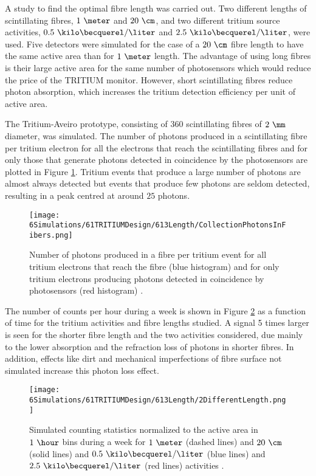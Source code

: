 A study to find the optimal fibre length was carried out. Two different lengths of scintillating fibres, $1~\meter$ and $20~\cm$, and two different tritium source activities, $0.5~\kilo\becquerel/\liter$ and $2.5~\kilo\becquerel/\liter$, were used. Five detectors were simulated for the case of a $20~\cm$ fibre length to have the same active area than for $1~\meter$ length. The advantage of using long fibres is their large active area for the same number of photosensors which would reduce the price of the TRITIUM monitor. However, short scintillating fibres reduce photon absorption, which increases the tritium detection efficiency per unit of active area. 

The Tritium-Aveiro prototype, consisting of $360$ scintillating fibres of $2~\mm$ diameter, was simulated. The number of photons produced in a scintillating fibre per tritium electron for all the electrons that reach the scintillating fibres and for only those that generate photons detected in coincidence by the photosensors are plotted in Figure \ref{fig:PhotonsFibersYesNoPhotosensors}. Tritium events that produce a large number of photons are almost always detected but events that produce few photons are seldom detected, resulting in a peak centred at around $25$ photons.  
\begin{figure}[h]
\centering
\texttt{[image: 6Simulations/61TRITIUMDesign/613Length/CollectionPhotonsInFibers.png]}
\caption{Number of photons produced in a fibre per tritium event for all tritium electrons that reach the fibre (blue histogram) and for only tritium electrons producing photons detected in coincidence by photosensors (red histogram) \cite{SimulationPaperCarlos}.\label{fig:PhotonsFibersYesNoPhotosensors}}
\end{figure}
The number of counts per hour during a week is shown in Figure \ref{fig:CountsOver60minDifferentLength} as a function of time for the tritium activities and fibre lengths studied. A signal 5 times larger is seen for the shorter fibre length and the two activities considered, due mainly to the lower absorption and the refraction loss of photons in shorter fibres. In addition, effects like dirt and mechanical imperfections of fibre surface not simulated increase this photon loss effect.

\begin{figure}[h]
\centering
\texttt{[image: 6Simulations/61TRITIUMDesign/613Length/2DifferentLength.png]}
\caption{Simulated counting statistics normalized to the active area in $1~\hour$ bins during a week for $1~\meter$ (dashed lines) and $20~\cm$ (solid lines) and $0.5~\kilo\becquerel/\liter$ (blue lines) and $2.5~\kilo\becquerel/\liter$ (red lines) activities \cite{SimulationPaperCarlos}. \label{fig:CountsOver60minDifferentLength}}
\end{figure}

